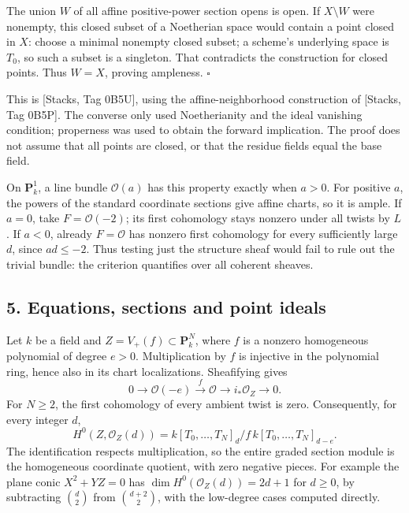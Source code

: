 \documentclass[11pt]{article}
\begin{document}
The union \(W\) of all affine positive-power section opens is open. If
\(X\setminus W\) were nonempty, this closed subset of a Noetherian space
would contain a point closed in \(X\): choose a minimal nonempty closed
subset; a scheme's underlying space is \(T_0\), so such a subset is a
singleton. That contradicts the construction for closed points. Thus
\(W=X\), proving ampleness. \(\square\)

This is {[}Stacks, Tag 0B5U{]}, using the affine-neighborhood
construction of {[}Stacks, Tag 0B5P{]}. The converse only used
Noetherianity and the ideal vanishing condition; properness was used to
obtain the forward implication. The proof does not assume that all
points are closed, or that the residue fields equal the base field.

On \(\mathbf P_k^1\), a line bundle \(\mathcal O(a)\) has this property
exactly when \(a>0\). For positive \(a\), the powers of the standard
coordinate sections give affine charts, so it is ample. If \(a=0\), take
\(F=\mathcal O(-2)\); its first cohomology stays nonzero under all
twists by \(L\). If \(a<0\), already \(F=\mathcal O\) has nonzero first
cohomology for every sufficiently large \(d\), since \(ad\le-2\). Thus
testing just the structure sheaf would fail to rule out the trivial
bundle: the criterion quantifies over all coherent sheaves.

\subsection{5. Equations, sections and point
ideals}\label{equations-sections-and-point-ideals}

Let \(k\) be a field and \(Z=V_+(f)\subset\mathbf P_k^N\), where \(f\)
is a nonzero homogeneous polynomial of degree \(e>0\). Multiplication by
\(f\) is injective in the polynomial ring, hence also in its chart
localizations. Sheafifying gives \[
0\longrightarrow\mathcal O(-e)\xrightarrow{\ f\ }\mathcal O
\longrightarrow i_*\mathcal O_Z\longrightarrow0.
\] For \(N\ge2\), the first cohomology of every ambient twist is zero.
Consequently, for every integer \(d\), \[
H^0(Z,\mathcal O_Z(d))=k[T_0,\ldots,T_N]_d/f\,k[T_0,\ldots,T_N]_{d-e}.
\] The identification respects multiplication, so the entire graded
section module is the homogeneous coordinate quotient, with zero
negative pieces. For example the plane conic \(X^2+YZ=0\) has
\(\dim H^0(\mathcal O_Z(d))=2d+1\) for \(d\ge0\), by subtracting
\(\binom d2\) from \(\binom{d+2}2\), with the low-degree cases computed
directly.
\end{document}
